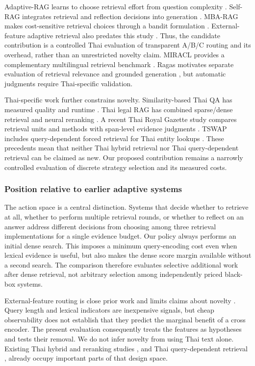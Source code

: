 Adaptive-RAG learns to choose retrieval effort from question complexity
\citep{ref7}. Self-RAG integrates retrieval and reflection decisions
into generation \citep{ref8}. MBA-RAG makes cost-sensitive retrieval
choices through a bandit formulation \citep{ref9}. External-feature
adaptive retrieval also predates this study \citep{ref10}. Thus, the
candidate contribution is a controlled Thai evaluation of transparent
A/B/C routing and its overhead, rather than an unrestricted novelty
claim. MIRACL provides a complementary multilingual retrieval benchmark
\citep{ref11}. Ragas motivates separate evaluation of retrieval
relevance and grounded generation \citep{ref12}, but automatic judgments
require Thai-specific validation.

Thai-specific work further constrains novelty. Similarity-based Thai QA
has measured quality and runtime \citep{ref13}. Thai legal RAG has
combined sparse/dense retrieval and neural reranking \citep{ref14}. A
recent Thai Royal Gazette study compares retrieval units and methods
with span-level evidence judgments \citep{ref15}. TSWAP includes
query-dependent forced retrieval for Thai entity lookups \citep{ref16}.
These precedents mean that neither Thai hybrid retrieval nor Thai
query-dependent retrieval can be claimed as new. Our proposed
contribution remains a narrowly controlled evaluation of discrete
strategy selection and its measured costs.

\hypertarget{position-relative-to-earlier-adaptive-systems}{%
\subsubsection{Position relative to earlier adaptive
systems}\label{position-relative-to-earlier-adaptive-systems}}

The action space is a central distinction. Systems that decide whether
to retrieve at all, whether to perform multiple retrieval rounds, or
whether to reflect on an answer address different decisions from
choosing among three retrieval implementations for a single evidence
budget. Our policy always performs an initial dense search. This imposes
a minimum query-encoding cost even when lexical evidence is useful, but
also makes the dense score margin available without a second search. The
comparison therefore evaluates selective additional work after dense
retrieval, not arbitrary selection among independently priced black-box
systems.

External-feature routing is close prior work and limits claims about
novelty \citep{ref10}. Query length and lexical indicators are
inexpensive signals, but cheap observability does not establish that
they predict the marginal benefit of a cross encoder. The present
evaluation consequently treats the features as hypotheses and tests
their removal. We do not infer novelty from using Thai text alone.
Existing Thai hybrid and reranking studies \citep{ref14}, and Thai
query-dependent retrieval \citep{ref16}, already occupy important parts
of that design space.

